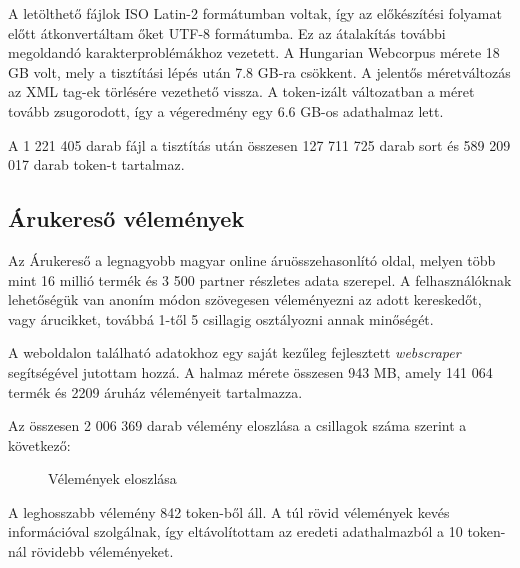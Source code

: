 A letölthető fájlok ISO Latin-2 formátumban voltak, így az előkészítési folyamat előtt átkonvertáltam őket UTF-8 formátumba. Ez az átalakítás további megoldandó karakterproblémákhoz vezetett. A Hungarian Webcorpus mérete 18 GB volt, mely a tisztítási lépés után 7.8 GB-ra csökkent. A jelentős méretváltozás az XML tag-ek törlésére vezethető vissza. A token-izált változatban a méret tovább zsugorodott, így a végeredmény egy 6.6 GB-os adathalmaz lett.

A 1 221 405 darab fájl a tisztítás után összesen 127 711 725 darab sort és 589 209 017 darab token-t tartalmaz.

\subsection{Árukereső vélemények}
Az Árukereső \cite{arukereso} a legnagyobb magyar online áruösszehasonlító oldal, melyen több mint 16 millió termék és 3 500 partner részletes adata szerepel. A felhasználóknak lehetőségük van anoním módon szövegesen véleményezni az adott kereskedőt, vagy árucikket, továbbá 1-től 5 csillagig osztályozni annak minőségét.

A weboldalon található adatokhoz egy saját kezűleg fejlesztett \textit{webscraper} segítségével jutottam hozzá. A halmaz mérete összesen 943 MB, amely 141 064 termék és 2209 áruház véleményeit tartalmazza. 

Az összesen 2 006 369 darab vélemény eloszlása a csillagok száma szerint a következő:

\begin{figure}[H]
	\centering
	\hspace{5pt}
	\caption{Vélemények eloszlása}
	\label{fig:example-2}
\end{figure}

A leghosszabb vélemény 842 token-ből áll. A túl rövid vélemények kevés információval szolgálnak, így eltávolítottam az eredeti adathalmazból a 10 token-nál rövidebb véleményeket. 